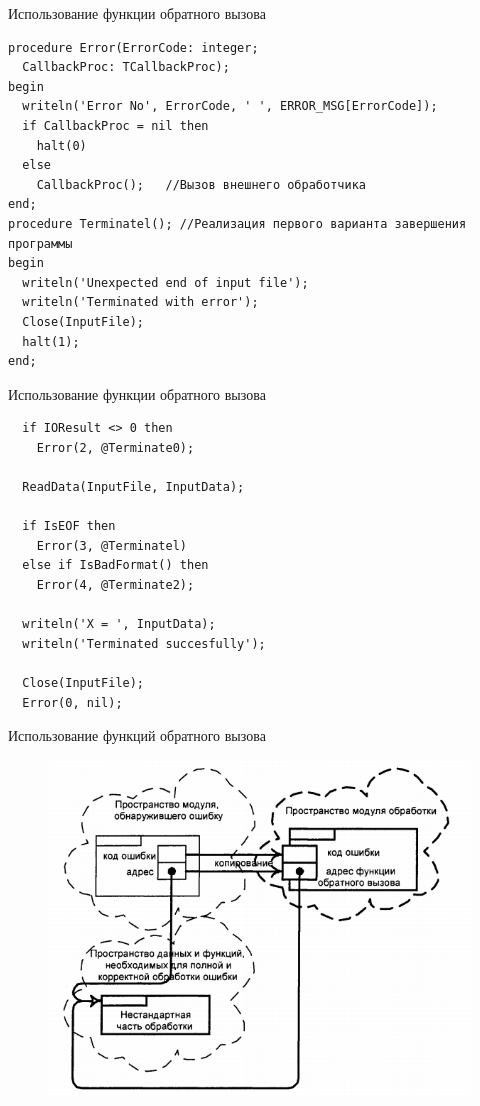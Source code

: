 \documentclass[xcolor=table]{beamer}
\begin{document}
\begin{frame}[fragile]{Использование функции обратного вызова}
	\begin{verbatim}
procedure Error(ErrorCode: integer; 
  CallbackProc: TCallbackProc);
begin
  writeln('Error No', ErrorCode, ' ', ERROR_MSG[ErrorCode]);
  if CallbackProc = nil then
    halt(0)
  else
    CallbackProc();   //Вызов внешнего обработчика
end;
procedure Terminatel(); //Реализация первого варианта завершения программы
begin
  writeln('Unexpected end of input file');
  writeln('Terminated with error');
  Close(InputFile);
  halt(1);
end;
	\end{verbatim}
\end{frame}

\begin{frame}[fragile]{Использование функции обратного вызова}
	\begin{verbatim}
  if IOResult <> 0 then
    Error(2, @Terminate0);

  ReadData(InputFile, InputData);

  if IsEOF then
    Error(3, @Terminatel)
  else if IsBadFormat() then
    Error(4, @Terminate2);
    
  writeln('X = ', InputData);
  writeln('Terminated succesfully');

  Close(InputFile);
  Error(0, nil);    
	\end{verbatim}
\end{frame}

\begin{frame}{Использование функций обратного вызова}
	\begin{figure}[h]
		\centering
		\includegraphics[scale=0.6]{images/lec08-pic05.png}
	\end{figure}
\end{frame}
\end{document}
